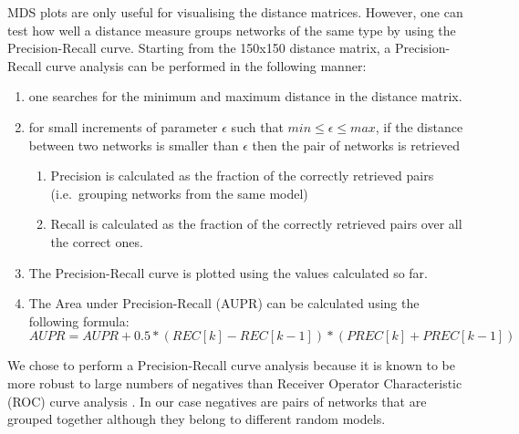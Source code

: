 MDS plots are only useful for visualising the distance matrices. However, one can test how well a distance measure groups networks of the same type by using the Precision-Recall curve. Starting from the 150x150 distance matrix, a Precision-Recall curve analysis can be performed in the following manner:
\begin{enumerate}
 \item one searches for the minimum and maximum distance in the distance matrix.
 \item for small increments of parameter $\epsilon$ such that $ min \le \epsilon \le max$, if the distance between two networks is smaller than $\epsilon$ then the pair of networks is retrieved
  \begin{enumerate}
  \item Precision is calculated as the fraction of the correctly retrieved pairs (i.e.\ grouping networks from the same model)
  \item Recall is calculated as the fraction of the correctly retrieved pairs over all the correct ones. 
  \end{enumerate}
 \item The Precision-Recall curve is plotted using the values calculated so far. 
 \item The Area under Precision-Recall (AUPR) can be calculated using the following formula:
	$$ AUPR = AUPR + 0.5 * (REC[k]-REC[k-1])*(PREC[k]+PREC[k-1]) $$
\end{enumerate}

We chose to perform a Precision-Recall curve analysis because it is known to be more robust to large numbers of negatives than Receiver Operator Characteristic (ROC) curve analysis \cite{davis2006relationship}. In our case negatives are pairs of networks that are grouped together although they belong to different random models.

